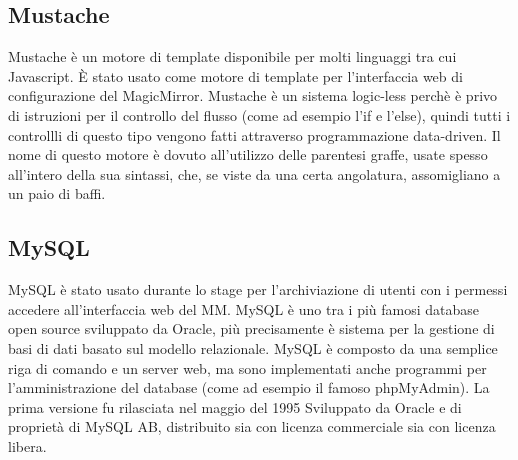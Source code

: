 \subsection{Mustache}
Mustache è un motore di template disponibile per molti linguaggi tra cui Javascript.
\`E stato usato come motore di template per l'interfaccia web di configurazione
del MagicMirror.
Mustache è un sistema logic-less perchè è privo di istruzioni per il controllo del flusso
(come ad esempio l'if e l'else), quindi tutti i controllli di questo tipo vengono fatti
attraverso programmazione data-driven.
Il nome di questo motore è dovuto all'utilizzo delle parentesi graffe, usate spesso
all'intero della sua sintassi, che, se viste da una certa angolatura, assomigliano
a un paio di baffi.

\subsection{MySQL}
MySQL è stato usato durante lo stage per l'archiviazione di utenti con i permessi accedere all'interfaccia web del MM.
MySQL è uno tra i più famosi database open source sviluppato da Oracle, più precisamente
è sistema per la gestione di basi di dati basato sul modello relazionale.
MySQL è composto da una semplice riga di comando e un server web, ma sono implementati anche programmi
per l'amministrazione del database (come ad esempio il famoso phpMyAdmin).
La prima versione fu rilasciata nel maggio del 1995 Sviluppato da Oracle e di proprietà di MySQL AB,
distribuito sia con licenza commerciale sia con licenza libera.


